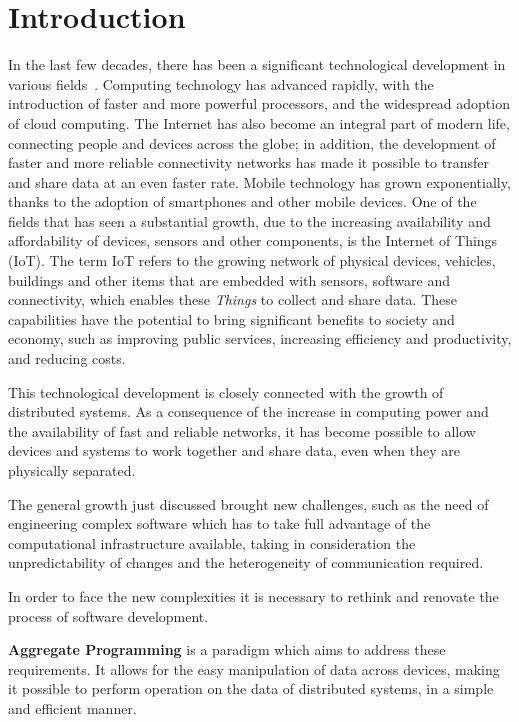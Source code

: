 \chapter{Introduction}\label{chapter:introduction}
In the last few decades, there has been a significant technological development in various fields~\cite{techological_evolution}.
Computing technology has advanced rapidly, with the introduction of faster and more powerful processors, and the widespread adoption of cloud computing.\newline
The Internet has also become an integral part of modern life, connecting people and devices across the globe; in addition, the development of faster and more reliable connectivity networks has made it possible to transfer and share data at an even faster rate.\newline
Mobile technology has grown exponentially, thanks to the adoption of smartphones and other mobile devices.\newline
One of the fields that has seen a substantial growth, due to the increasing availability and affordability of devices, sensors and other components, is the Internet of Things (IoT). The term IoT refers to the growing network of physical devices, vehicles, buildings and other items that are embedded with sensors, software and connectivity, which enables these \textit{Things} to collect and share data. These capabilities have the potential to bring significant benefits to society and economy, such as improving public services, increasing efficiency and productivity, and reducing costs.

This technological development is closely connected with the growth of distributed systems. As a consequence of the increase in computing power and the availability of fast and reliable networks, it has become possible to allow devices and systems to work together and share data, even when they are physically separated.

The general growth just discussed brought new challenges, such as the need of engineering complex software which has to take full advantage of the computational infrastructure available, taking in consideration the unpredictability of changes and the heterogeneity of communication required.

In order to face the new complexities it is necessary to rethink and renovate the process of software development.

\textbf{Aggregate Programming} is a paradigm which aims to address these requirements. It allows for the easy manipulation of data across devices, making it possible to perform operation on the data of distributed systems, in a simple and efficient manner.

